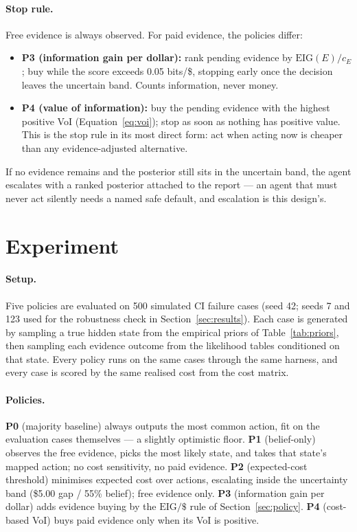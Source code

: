 \documentclass{article}
\begin{document}
\paragraph{Stop rule.} Free evidence is always observed. For paid evidence, the policies differ:
\begin{itemize}
\item \textbf{P3 (information gain per dollar):} rank pending evidence by $\mathrm{EIG}(E)/c_E$; buy while the score exceeds 0.05 bits/\$, stopping early once the decision leaves the uncertain band. Counts information, never money.
\item \textbf{P4 (value of information):} buy the pending evidence with the highest positive VoI (Equation~\ref{eq:voi}); stop as soon as nothing has positive value. This is the stop rule in its most direct form: act when acting now is cheaper than any evidence-adjusted alternative.
\end{itemize}
If no evidence remains and the posterior still sits in the uncertain band, the agent escalates with a ranked posterior attached to the report --- an agent that must never act silently needs a named safe default, and escalation is this design's.

\section{Experiment}

\paragraph{Setup.} Five policies are evaluated on 500 simulated CI failure cases (seed 42; seeds 7 and 123 used for the robustness check in Section~\ref{sec:results}). Each case is generated by sampling a true hidden state from the empirical priors of Table~\ref{tab:priors}, then sampling each evidence outcome from the likelihood tables conditioned on that state. Every policy runs on the same cases through the same harness, and every case is scored by the same realised cost from the cost matrix.

\paragraph{Policies.}
\textbf{P0} (majority baseline) always outputs the most common action, fit on the evaluation cases themselves --- a slightly optimistic floor.
\textbf{P1} (belief-only) observes the free evidence, picks the most likely state, and takes that state's mapped action; no cost sensitivity, no paid evidence.
\textbf{P2} (expected-cost threshold) minimises expected cost over actions, escalating inside the uncertainty band (\$5.00 gap / 55\% belief); free evidence only.
\textbf{P3} (information gain per dollar) adds evidence buying by the $\mathrm{EIG}/\$$ rule of Section~\ref{sec:policy}.
\textbf{P4} (cost-based VoI) buys paid evidence only when its VoI is positive.
\end{document}

